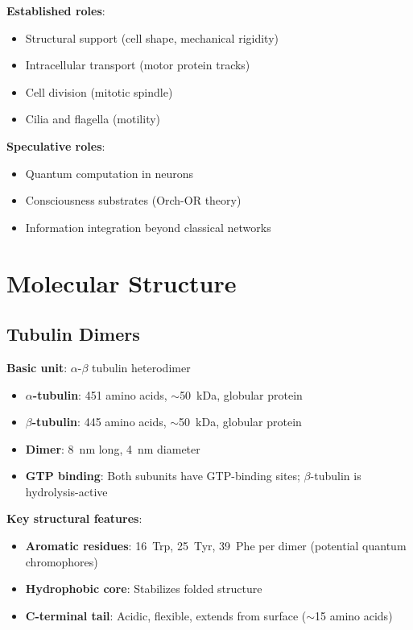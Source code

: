 \textbf{Established roles}:
\begin{itemize}
\item Structural support (cell shape, mechanical rigidity)
\item Intracellular transport (motor protein tracks)
\item Cell division (mitotic spindle)
\item Cilia and flagella (motility)
\end{itemize}

\textbf{Speculative roles}:
\begin{itemize}
\item Quantum computation in neurons
\item Consciousness substrates (Orch-OR theory)
\item Information integration beyond classical networks
\end{itemize}

\section{Molecular Structure}
\label{sec:molecular-structure}

\subsection{Tubulin Dimers}
\label{subsec:tubulin-dimers}

\textbf{Basic unit}: $\alpha$-$\beta$ tubulin heterodimer
\begin{itemize}
\item \textbf{$\alpha$-tubulin}: 451 amino acids, $\sim$50~kDa, globular protein
\item \textbf{$\beta$-tubulin}: 445 amino acids, $\sim$50~kDa, globular protein
\item \textbf{Dimer}: 8~nm long, 4~nm diameter
\item \textbf{GTP binding}: Both subunits have GTP-binding sites; $\beta$-tubulin is hydrolysis-active
\end{itemize}

\textbf{Key structural features}:
\begin{itemize}
\item \textbf{Aromatic residues}: 16~Trp, 25~Tyr, 39~Phe per dimer (potential quantum chromophores)
\item \textbf{Hydrophobic core}: Stabilizes folded structure
\item \textbf{C-terminal tail}: Acidic, flexible, extends from surface ($\sim$15 amino acids)
\end{itemize}


